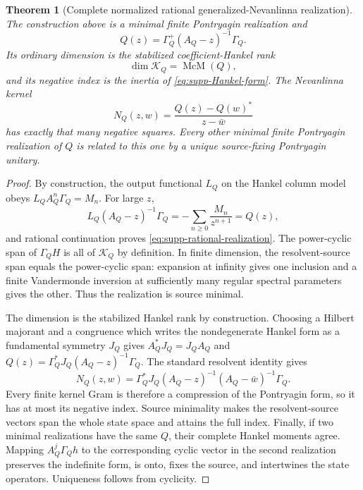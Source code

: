 \documentclass[11pt]{article}
\newtheorem{theorem}{Theorem}[section]
\theoremstyle{definition}
\theoremstyle{remark}
\theoremstyle{definition}
\theoremstyle{remark}
\newcommand{\McM}{\operatorname{McM}}
\begin{document}
\begin{theorem}[Complete normalized rational generalized-Nevanlinna realization]
\label{thm:supp-complete-rational-Krein}
The construction above is a minimal finite Pontryagin realization and
\begin{equation}
{Q(z)=\Gamma_Q^+(A_Q-z)^{-1}\Gamma_Q.}
\label{eq:supp-rational-realization}
\end{equation}
Its ordinary dimension is the stabilized coefficient-Hankel rank
\begin{equation}
\dim\mathcal K_Q=\McM(Q),
\label{eq:supp-rational-degree}
\end{equation}
and its negative index is the inertia of
\eqref{eq:supp-Hankel-form}.  The Nevanlinna kernel
\begin{equation}
N_Q(z,w)=\frac{Q(z)-Q(w)^*}{z-\bar w}
\label{eq:supp-Nevanlinna-kernel}
\end{equation}
has exactly that many negative squares.  Every other minimal finite
Pontryagin realization of $Q$ is related to this one by a unique source-fixing
Pontryagin unitary.
\end{theorem}

\begin{proof}
By construction, the output functional $L_Q$ on the Hankel column model obeys
$L_QA_Q^n\Gamma_Q=M_n$.  For large $z$,
\[
L_Q(A_Q-z)^{-1}\Gamma_Q
=-\sum_{n\ge0}\frac{M_n}{z^{n+1}}=Q(z),
\]
and rational continuation proves \eqref{eq:supp-rational-realization}.  The
power-cyclic span of $\Gamma_QH$ is all of $\mathcal K_Q$ by definition.  In finite
dimension, the resolvent-source span equals the power-cyclic span: expansion at
infinity gives one inclusion and a finite Vandermonde inversion at sufficiently many
regular spectral parameters gives the other.  Thus the realization is source
minimal.

The dimension is the stabilized Hankel rank by construction.  Choosing a Hilbert
majorant and a congruence which writes the nondegenerate Hankel form as a fundamental
symmetry $J_Q$ gives $A_Q^*J_Q=J_QA_Q$ and
$Q(z)=\Gamma_Q^*J_Q(A_Q-z)^{-1}\Gamma_Q$.  The standard resolvent identity gives
\[
N_Q(z,w)
=\Gamma_Q^*J_Q(A_Q-z)^{-1}(A_Q-\bar w)^{-1}\Gamma_Q.
\]
Every finite kernel Gram is therefore a compression of the Pontryagin form, so it
has at most its negative index.  Source minimality makes the resolvent-source vectors
span the whole state space and attains the full index.  Finally, if two
minimal realizations have the same $Q$, their complete Hankel moments agree.
Mapping $A_Q^j\Gamma_Qh$ to the corresponding cyclic vector in the second
realization preserves the indefinite form, is onto, fixes the source, and
intertwines the state operators.  Uniqueness follows from cyclicity.
\end{proof}
\end{document}
